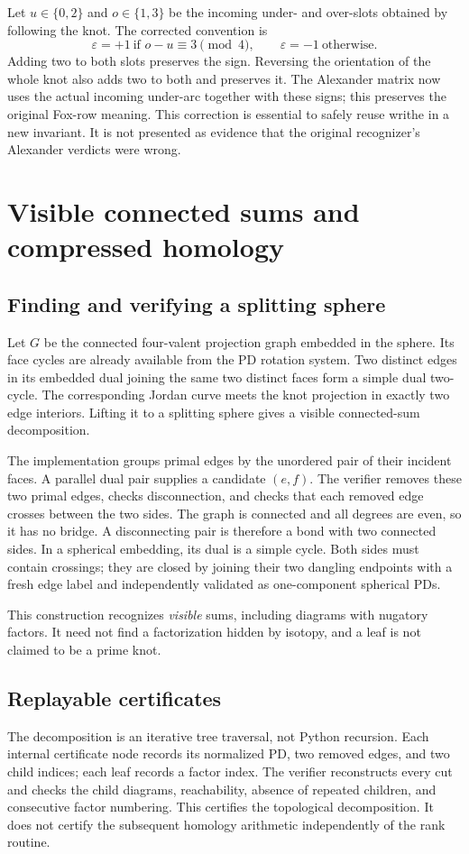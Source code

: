 \documentclass[11pt]{article}
\theoremstyle{remark}\newtheorem{remark}[theorem]{Remark}
\begin{document}
Let $u\in\{0,2\}$ and $o\in\{1,3\}$ be the incoming under- and over-slots
obtained by following the knot. The corrected convention is
\[
 \varepsilon=+1\ \text{if }o-u\equiv3\pmod4,
 \qquad \varepsilon=-1\ \text{otherwise}.
\]
Adding two to both slots preserves the sign. Reversing the orientation of
the whole knot also adds two to both and preserves it. The Alexander
matrix now uses the actual incoming under-arc together with these signs;
this preserves the original Fox-row meaning. This correction is essential
to safely reuse writhe in a new invariant. It is not presented as evidence
that the original recognizer's Alexander verdicts were wrong.

\section{Visible connected sums and compressed homology}\label{sec:sums}
\subsection{Finding and verifying a splitting sphere}
Let $G$ be the connected four-valent projection graph embedded in the
sphere. Its face cycles are already available from the PD rotation system.
Two distinct edges in its embedded dual joining the same two distinct
faces form a simple dual two-cycle. The corresponding Jordan curve meets
the knot projection in exactly two edge interiors. Lifting it to a
splitting sphere gives a visible connected-sum decomposition.

The implementation groups primal edges by the unordered pair of their
incident faces. A parallel dual pair supplies a candidate $(e,f)$.
The verifier removes these two primal edges, checks disconnection, and
checks that each removed edge crosses between the two sides. The graph is
connected and all degrees are even, so it has no bridge. A disconnecting
pair is therefore a bond with two connected sides. In a spherical
embedding, its dual is a simple cycle. Both sides must contain crossings;
they are closed by joining their two dangling endpoints with a fresh
edge label and independently validated as one-component spherical PDs.

This construction recognizes \emph{visible} sums, including diagrams with
nugatory factors. It need not find a factorization hidden by isotopy, and
a leaf is not claimed to be a prime knot.

\subsection{Replayable certificates}
The decomposition is an iterative tree traversal, not Python recursion.
Each internal certificate node records its normalized PD, two removed
edges, and two child indices; each leaf records a factor index. The
verifier reconstructs every cut and checks the child diagrams, reachability,
absence of repeated children, and consecutive factor numbering.
This certifies the topological decomposition. It does not certify the
subsequent homology arithmetic independently of the rank routine.
\end{document}
